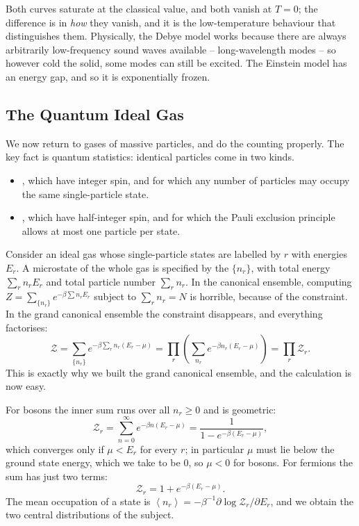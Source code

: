 \documentclass[a4paper]{scrartcl}
\newcommand{\avg}[1]{\left\langle #1 \right\rangle}
\begin{document}
Both curves saturate at the classical value, and both vanish at $T=0$; the difference is in \emph{how} they vanish, and it is the low-temperature behaviour that distinguishes them. Physically, the Debye model works because there are always arbitrarily low-frequency sound waves available -- long-wavelength modes -- so however cold the solid, some modes can still be excited. The Einstein model has an energy gap, and so it is exponentially frozen.

\subsection{The Quantum Ideal Gas}

We now return to gases of massive particles, and do the counting properly. The key fact is quantum statistics: identical particles come in two kinds.

\begin{itemize}
	\item {}, which have integer spin, and for which any number of particles may occupy the same single-particle state.
	\item {}, which have half-integer spin, and for which the Pauli exclusion principle allows at most one particle per state.
\end{itemize}

Consider an ideal gas whose single-particle states are labelled by $r$ with energies $E_r$. A microstate of the whole gas is specified by the  $\{n_r\}$, with total energy $\sum_r n_r E_r$ and total particle number $\sum_r n_r$. In the canonical ensemble, computing $Z = \sum_{\{n_r\}} e^{-\beta\sum n_r E_r}$ subject to $\sum_r n_r = N$ is horrible, because of the constraint. In the grand canonical ensemble the constraint disappears, and everything factorises:
$$
\mathcal Z = \sum_{\{n_r\}}e^{-\beta\sum_r n_r(E_r - \mu)} = \prod_r \left(\sum_{n_r} e^{-\beta n_r (E_r-\mu)}\right) = \prod_r \mathcal Z_r.
$$
This is exactly why we built the grand canonical ensemble, and the calculation is now easy.

For bosons the inner sum runs over all $n_r \ge 0$ and is geometric:
$$
\mathcal Z_r = \sum_{n=0}^\infty e^{-\beta n(E_r - \mu)} = \frac{1}{1 - e^{-\beta(E_r-\mu)}},
$$
which converges only if $\mu < E_r$ for every $r$; in particular $\mu$ must lie below the ground state energy, which we take to be $0$, so $\mu < 0$ for bosons. For fermions the sum has just two terms:
$$
\mathcal Z_r = 1 + e^{-\beta(E_r-\mu)}.
$$
The mean occupation of a state is $\avg{n_r} = -\beta^{-1}\partial \log\mathcal Z_r/\partial E_r$, and we obtain the two central distributions of the subject.
\end{document}
